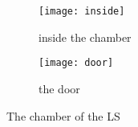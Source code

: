 \documentclass{article}
\begin{document}
\begin{figure}
    \newcommand{\picwidth}{0.5\textwidth}
    \centering
    \begin{subfigure}{\picwidth}
        \texttt{[image: inside]}
        \caption{inside the chamber}
        \label{fig:inside}
    \end{subfigure}\:
    \begin{subfigure}{\picwidth}
        \texttt{[image: door]}
        \caption{the door}
        \label{fig:door}
    \end{subfigure}
    \caption{The chamber of the LS}
    \label{fig:chamber}
\end{figure}
\end{document}
